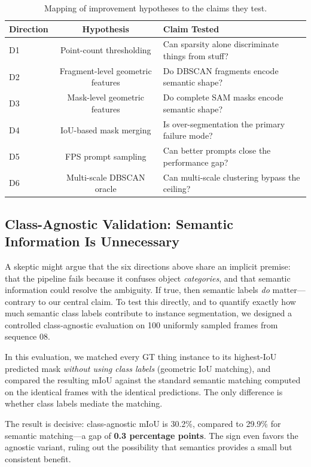 \documentclass{article}
\begin{document}
\begin{table}[t]
\centering
\caption{Mapping of improvement hypotheses to the claims they test.}
\label{tab:claims}
\begin{tabular}{lcl}
\toprule
Direction & Hypothesis & Claim Tested \\
\midrule
D1 & Point-count thresholding & Can sparsity alone discriminate things from stuff? \\
D2 & Fragment-level geometric features & Do DBSCAN fragments encode semantic shape? \\
D3 & Mask-level geometric features & Do complete SAM masks encode semantic shape? \\
D4 & IoU-based mask merging & Is over-segmentation the primary failure mode? \\
D5 & FPS prompt sampling & Can better prompts close the performance gap? \\
D6 & Multi-scale DBSCAN oracle & Can multi-scale clustering bypass the ceiling? \\
\bottomrule
\end{tabular}
\end{table}

\subsection{Class-Agnostic Validation: Semantic Information Is Unnecessary}

A skeptic might argue that the six directions above share an implicit premise: that
the pipeline fails because it confuses object \emph{categories}, and that semantic
information could resolve the ambiguity. If true, then semantic labels \emph{do}
matter---contrary to our central claim. To test this directly, and to quantify exactly
how much semantic class labels contribute to instance segmentation, we designed a
controlled class-agnostic evaluation on 100 uniformly sampled frames from sequence 08.

In this evaluation, we matched every GT thing instance to its highest-IoU predicted
mask \emph{without using class labels} (geometric IoU matching), and compared the
resulting mIoU against the standard semantic matching computed on the identical frames
with the identical predictions. The only difference is whether class labels mediate
the matching.

The result is decisive: class-agnostic mIoU is 30.2\%, compared to 29.9\% for semantic
matching---a gap of \textbf{0.3 percentage points}. The sign even favors the agnostic
variant, ruling out the possibility that semantics provides a small but consistent
benefit.
\end{document}
